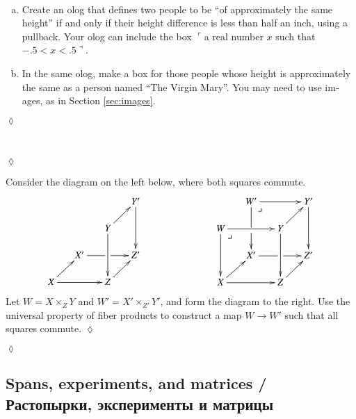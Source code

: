 \documentclass[a4paper]{book}
\makeatletter
\def\tn{\textnormal}
\def\to{\rightarrow}
\newcommand{\fakebox}[1]{\tn{$\ulcorner$#1$\urcorner$}}
\def\ullimit{\ar@{}[rd]|(.3)*+{\lrcorner}}
\theoremstyle{myth}
\newtheorem{excENG}[envENG]{\begin{english}Exercise\end{english}}
\newenvironment{exerciseENG}{\begin{excENG}}{\hspace*{\fill}$\lozenge$\end{excENG}}
\newtheorem{excRUS}[envRUS]{\begin{russian}Упражнение\end{russian}}
\newenvironment{exerciseRUS}{\begin{excRUS}}{\hspace*{\fill}$\lozenge$\end{excRUS}}
\def\sexc{\begin{enumerate}[a.)]\setlength{\itemsep}{.1cm}\setlength{\parskip}{.1cm}\item}
\def\next{\item}
\def\endsexc{\end{enumerate}}
\makeatother
\begin{document}
\begin{english}
\begin{russian} \end{russian}

\begin{exerciseENG}~
\sexc Create an olog that defines two people to be “of approximately the same height” if and only if their height difference is less than half an inch, using a pullback. Your olog can include the box \fakebox{a real number $x$ such that $-.5<x<.5$}. 
\next In the same olog, make a box for those people whose height is approximately the same as a person named “The Virgin Mary”. You may need to use images, as in Section \ref{sec:images}.
\endsexc
\end{exerciseENG}

\begin{exerciseRUS}~
\begin{russian} \end{russian}
\end{exerciseRUS}

\begin{exerciseENG}\label{exc:pointwise map of fp}
Consider the diagram on the left below, where both squares commute. 
$$
\xymatrix@=15pt{
&&&Y'\ar[dd]\\
&&Y\ar[ru]\ar[dd]\\
&X'\ar'[r][rr]&&Z'\\
X\ar[rr]\ar[ru]&&Z\ar[ru]
}
\hspace{1in}
\xymatrix@=15pt{
&W'\ar[rr]\ar'[d][dd]\ullimit&&Y'\ar[dd]\\
W\ar[rr]\ar[dd]\ullimit&&Y\ar[ru]\ar[dd]\\
&X'\ar'[r][rr]&&Z'\\
X\ar[rr]\ar[ru]&&Z\ar[ru]
}
$$
Let $W=X\times_ZY$ and $W'=X'\times_{Z'}Y'$, and form the diagram to the right. Use the universal property of fiber products to construct a map $W\to W'$ such that all squares commute.
\end{exerciseENG}

\begin{exerciseRUS}\label{exc:pointwise map of fp}
\begin{russian} \end{russian}
\end{exerciseRUS}


\subsection{Spans, experiments, and matrices / Растопырки, эксперименты и матрицы}


\end{english}
\end{document}

